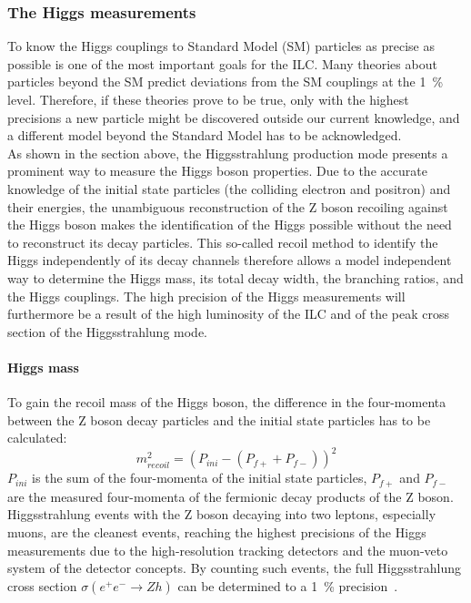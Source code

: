 \subsubsection{The Higgs measurements}
To know the Higgs couplings to Standard Model (SM) particles as precise as possible is one of the most important goals for the ILC.
Many theories about particles beyond the SM predict deviations from the SM couplings at the \SI{1}{\percent} level.
Therefore, if these theories prove to be true, only with the highest precisions a new particle might be discovered outside our current knowledge, and a different model beyond the Standard Model has to be acknowledged.
\\As shown in the section above, the Higgsstrahlung production mode presents a prominent way to measure the Higgs boson properties.
Due to the accurate knowledge of the initial state particles (the colliding electron and positron) and their energies, the unambiguous reconstruction of the Z boson recoiling against the Higgs boson makes the identification of the Higgs possible without the need to reconstruct its decay particles.
This so-called recoil method to identify the Higgs independently of its decay channels therefore allows a model independent way to determine the Higgs mass, its total decay width, the branching ratios, and the Higgs couplings. 
The high precision of the Higgs measurements will furthermore be a result of the high luminosity of the ILC and of the peak cross section of the Higgsstrahlung mode.

\paragraph{Higgs mass}
To gain the recoil mass of the Higgs boson, the difference in the four-momenta between the Z boson decay particles and the initial state particles has to be calculated:
\begin{equation}
 m_{recoil}^2=(P_{ini}-(P_{f+}+P_{f-}))^2
\end{equation}
$P_{ini}$ is the sum of the four-momenta of the initial state particles, $P_{f+}$ and $P_{f-}$ are the measured four-momenta of the fermionic decay products of the Z boson.\\
Higgsstrahlung events with the Z boson decaying into two leptons, especially muons, are the cleanest events, reaching the highest precisions of the Higgs measurements due to the high-resolution tracking detectors and the muon-veto system of the detector concepts.
By counting such events, the full Higgsstrahlung cross section $\sigma(e^+e^-\rightarrow Zh)$ can be determined to a \SI{1}{\percent} precision~\cite[p. 12]{PhysicsCase}.


